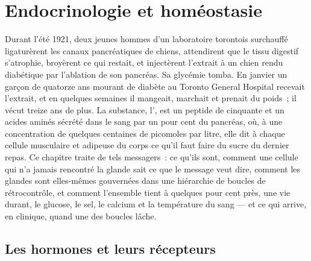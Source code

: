 \chapter{Endocrinologie et homéostasie}\label{ch:b3:endocrinology}

Durant l'été 1921, deux jeunes hommes d'un laboratoire torontois
surchauffé ligaturèrent les canaux pancréatiques de chiens, attendirent
que le tissu digestif s'atrophie, broyèrent ce qui restait, et
injectèrent l'extrait à un chien rendu diabétique par l'ablation de son
pancréas. Sa glycémie tomba. En janvier un garçon de quatorze ans
mourant de diabète au Toronto General Hospital recevait l'extrait, et en
quelques semaines il mangeait, marchait et prenait du poids~; il vécut
treize ans de plus. La substance, l', est un peptide de
cinquante et un acides aminés sécrété dans le sang par un pour cent du
pancréas, où, à une concentration de quelques centaines de picomoles par
litre, elle dit à chaque cellule musculaire et adipeuse du corps ce
qu'il faut faire du sucre du dernier repas. Ce chapitre traite de tels
messagers~: ce qu'ils sont, comment une cellule qui n'a jamais rencontré
la glande sait ce que le message veut dire, comment les glandes sont
elles-mêmes gouvernées dans une hiérarchie de boucles de rétrocontrôle,
et comment l'ensemble tient à quelques pour cent près, une vie durant,
le glucose, le sel, le calcium et la température du sang --- et ce qui
arrive, en clinique, quand une des boucles lâche.

\section{Les hormones et leurs récepteurs}

